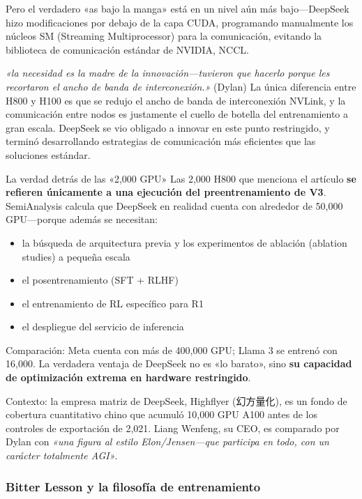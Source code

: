 Pero el verdadero «as bajo la manga» está en un nivel aún más bajo—DeepSeek hizo modificaciones por debajo de la capa CUDA, programando manualmente los núcleos SM (Streaming Multiprocessor) para la comunicación, evitando la biblioteca de comunicación estándar de NVIDIA, NCCL.

\textit{«la necesidad es la madre de la innovación—tuvieron que hacerlo porque les recortaron el ancho de banda de interconexión.»} (Dylan) La única diferencia entre H800 y H100 es que se redujo el ancho de banda de interconexión NVLink, y la comunicación entre nodos es justamente el cuello de botella del entrenamiento a gran escala. DeepSeek se vio obligado a innovar en este punto restringido, y terminó desarrollando estrategias de comunicación más eficientes que las soluciones estándar.

\begin{warningbox}{La verdad detrás de las «2,000 GPU»}
Las 2,000 H800 que menciona el artículo \textbf{se refieren únicamente a una ejecución del preentrenamiento de V3}. SemiAnalysis calcula que DeepSeek en realidad cuenta con alrededor de 50,000 GPU—porque además se necesitan:
\begin{itemize}
    \item la búsqueda de arquitectura previa y los experimentos de ablación (ablation studies) a pequeña escala
    \item el posentrenamiento (SFT + RLHF)
    \item el entrenamiento de RL específico para R1
    \item el despliegue del servicio de inferencia
\end{itemize}

Comparación: Meta cuenta con más de 400,000 GPU; Llama 3 se entrenó con 16,000. La verdadera ventaja de DeepSeek no es «lo barato», sino \textbf{su capacidad de optimización extrema en hardware restringido}.

Contexto: la empresa matriz de DeepSeek, Highflyer (幻方量化), es un fondo de cobertura cuantitativo chino que acumuló 10,000 GPU A100 antes de los controles de exportación de 2,021. Liang Wenfeng, su CEO, es comparado por Dylan con \textit{«una figura al estilo Elon/Jensen—que participa en todo, con un carácter totalmente AGI»}.
\end{warningbox}

\subsubsection{Bitter Lesson y la filosofía de entrenamiento}

